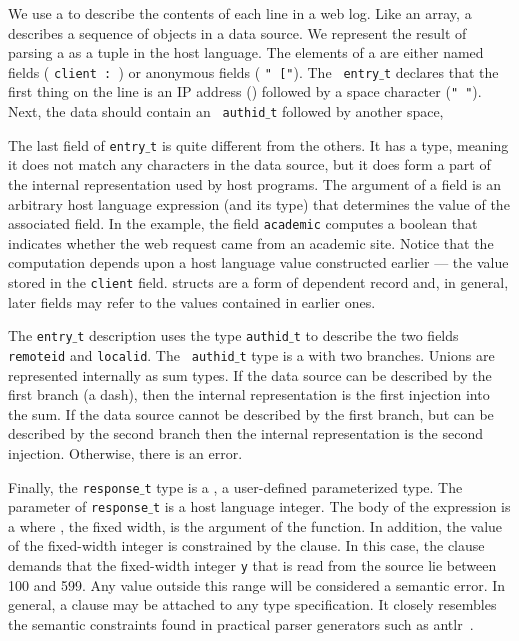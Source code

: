We use a \Pstruct{} to describe the contents of each line in a web log.
Like an array, a \Pstruct{} describes a sequence of 
objects in a data source.  We represent the result of parsing a \Pstruct{} 
as a tuple in the host language.  The elements
of a \Pstruct{} are either named fields (\eg{} {\tt client {:} \Pip{}}) or
anonymous fields (\eg{} {\tt "~["}).  The \Pstruct{} {\tt
entry$\_$t} declares that the first thing on the line
is an IP address (\Pip) followed by a space
character ({\tt " "}).  Next, the data should contain an {\tt
authid$\_$t} followed by another space, \etc{}

The last field of {\tt entry$\_$t} is quite different from the others.
It has a \Pcompute{} type, meaning it does not match any characters in
the data source, but it does form a part of the internal representation
used by host programs.  The argument of a \Pcompute{}
field is an arbitrary host language expression (and its
type) that determines the value of the associated field.  In the example, the
field {\tt academic} computes a boolean that indicates whether 
the web request came from an academic site. Notice that the computation
depends upon a host language value constructed earlier --- the value
stored in the {\tt client} field.  \ipads{} structs are a form
of dependent record and, in general, later fields may
refer to the values contained in earlier ones.

The {\tt entry$\_$t} description uses the type {\tt authid$\_$t} to
describe the two fields {\tt remoteid} and {\tt localid}.  The {\tt
authid$\_$t} type is a \Punion{} with two branches.  Unions are
represented internally as sum types.  If the data source can be
described by the first branch (a dash), then the internal
representation is the first injection into the sum.  If the data
source cannot be described by the first branch, but can be described
by the second branch then the internal representation is the second
injection.  Otherwise, there is an error.

Finally, the {\tt response$\_$t} type is a \Pfun, a user-defined
parameterized type.  The parameter of {\tt response$\_$t} is a host
language integer.  The body of the \Pfun{} expression is a 
where , the fixed width, is the argument of the function.  In
addition, the value of the fixed-width integer is constrained by the
\Pwhere{} clause.  In this case, the \Pwhere{} clause demands that
the fixed-width integer {\tt y} that is read from the source lie 
between 100 and 599.
Any value outside this range will be considered a semantic error.
In general, a \Pwhere{} clause may be attached to 
any type specification.  It closely resembles the 
semantic constraints found in practical parser generators such as
{\sc antlr}~\cite{antlr}.

